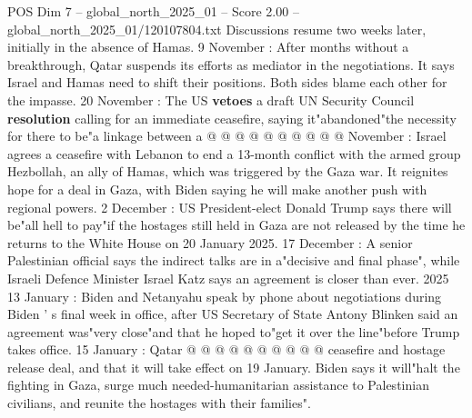 \begin{textsample}{POS Dim 7 – global\_north\_2025\_01 – Score 2.00 – global\_north\_2025\_01/120107804.txt}
Discussions resume two weeks later, initially in the absence of Hamas. 9 November : After months without a breakthrough, Qatar suspends its efforts as mediator in the negotiations.
It says Israel and Hamas need to shift their positions.
Both sides blame each other for the impasse. 20 November : The US \textbf{vetoes} a draft UN Security Council \textbf{resolution} calling for an immediate ceasefire, saying it"abandoned"the necessity for there to be"a linkage between a @ @ @ @ @ @ @ @ @ @ November : Israel agrees a ceasefire with Lebanon to end a 13-month conflict with the armed group Hezbollah, an ally of Hamas, which was triggered by the Gaza war.
It reignites hope for a deal in Gaza, with Biden saying he will make another push with regional powers. 2 December : US President-elect Donald Trump says there will be"all hell to pay"if the hostages still held in Gaza are not released by the time he returns to the White House on 20 January 2025. 17 December : A senior Palestinian official says the indirect talks are in a"decisive and final phase", while Israeli Defence Minister Israel Katz says an agreement is closer than ever. 2025 13 January : Biden and Netanyahu speak by phone about negotiations during Biden ' s final week in office, after US Secretary of State Antony Blinken said an agreement was"very close"and that he hoped to"get it over the line"before Trump takes office. 15 January : Qatar @ @ @ @ @ @ @ @ @ @ ceasefire and hostage release deal, and that it will take effect on 19 January.
Biden says it will"halt the fighting in Gaza, surge much needed-humanitarian assistance to Palestinian civilians, and reunite the hostages with their families".

\end{textsample}
